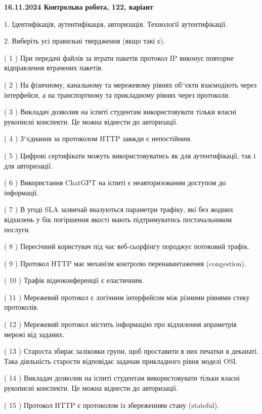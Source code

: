 \documentclass[12pt, ukrainian]{article}
\begin{document}
\vspace{4mm}
\newpage
\begin {large}

\textbf{16.11.2024 Контрольна робота, 122, варіант  }\par


{
1. Ідентифікація, аутентифікація, авторизація. Технології аутентифікації.



\vspace{5mm}
2. Виберіть усі правильні твердження (якщо такі є).\par
\vspace{2mm}

( 1 ) При передачі файлів за втрати пакетів протокол IP виконує повторне відправлення втрачених пакетів.

( 2 ) На фізичному, канальному та мережевому рівнях об“єкти взаємодіють через інтерфейси, а на транспортному та прикладному рівнях через протоколи.

( 3 ) Викладач дозволив на іспиті студентам використовувати тільки власні рукописні конспекти. Це можна віднести до авторизації.

( 4 ) З“єднання за протоколом  HTTP завжди є непостійним.

( 5 ) Цифрові сертифікати можуть використовуватись як для аутентифікації, так і для авторизації.

( 6 ) Використання ChatGPT на іспиті є неавторизованим доступом до інформації.

( 7 ) В угоді SLA зазвичай вказуються параметри трафіку, які без жодних відхилень у бік погіршення якості мають підтримуватись постачальником послуги.

( 8 ) Пересічний користувач під час веб-сьорфінгу породжує потоковий трафік.

( 9 ) Протокол HTTP має механізм контролю перенавантаження (congestion).

( 10 ) Трафік відеоконференції є еластичним.

( 11 ) Мережевий протокол є логічним інтерфейсом між різними рівнями стеку протоколів.

( 12 ) Мережевий протокол містить інформацію про відхилення апраметрів мережі від заданих.

( 13 ) Староста збирає заліковки групи, щоб проставити в них печатки в деканаті. Така діяльність старости відповідає задачам прикладного рівня моделі OSI.

( 14 ) Викладач дозволив на іспиті студентам використовувати тільки власні рукописні конспекти. Це можна віднести до авторизації.

( 15 ) Протокол  HTTP є протоколом із збереженням стану (stateful).
}
\end {large}
\end{document}
